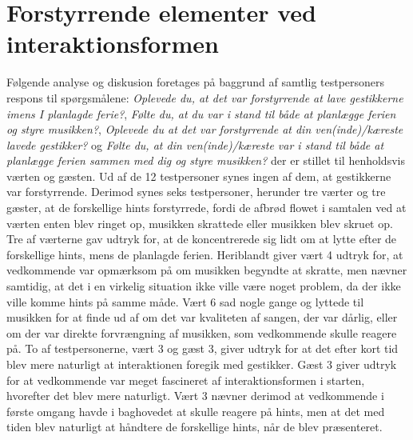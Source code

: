 \section{Forstyrrende elementer ved interaktionsformen}
\label{TestresultaterSocialAcceptForstyrrende}
%
Følgende analyse og diskusion foretages på baggrund af samtlig testpersoners respons til spørgsmålene: \textit{Oplevede du, at det var forstyrrende at lave gestikkerne imens I planlagde ferie?}, \textit{Følte du, at du var i stand til både at planlægge ferien og styre musikken?}, \textit{Oplevede du at det var forstyrrende at din ven(inde)/kæreste lavede gestikker?} og \textit{Følte du, at din ven(inde)/kæreste var i stand til både at planlægge ferien sammen med dig og styre musikken?} der er stillet til henholdsvis værten og gæsten. \blankline
%
Ud af de 12 testpersoner synes ingen af dem, at gestikkerne var forstyrrende. Derimod synes seks testpersoner, herunder tre værter og tre gæster, at de forskellige hints forstyrrede, fordi de afbrød flowet i samtalen ved at værten enten blev ringet op, musikken skrattede eller musikken blev skruet op. Tre af værterne gav udtryk for, at de koncentrerede sig lidt om at lytte efter de forskellige hints, mens de planlagde ferien. Heriblandt giver vært 4 udtryk for, at vedkommende var opmærksom på om musikken begyndte at skratte, men nævner samtidig, at det i en virkelig situation ikke ville være noget problem, da der ikke ville komme hints på samme måde. Vært 6 sad nogle gange og lyttede til musikken for at finde ud af om det var kvaliteten af sangen, der var dårlig, eller om der var direkte forvrængning af musikken, som vedkommende skulle reagere på. To af testpersonerne, vært 3 og gæst 3, giver udtryk for at det efter kort tid blev mere naturligt at interaktionen foregik med gestikker. Gæst 3 giver udtryk for at vedkommende var meget fascineret af interaktionsformen i starten, hvorefter det blev mere naturligt. Vært 3 nævner derimod at vedkommende i første omgang havde i baghovedet at skulle reagere på hints, men at det med tiden blev naturligt at håndtere de forskellige hints, når de blev præsenteret. 

